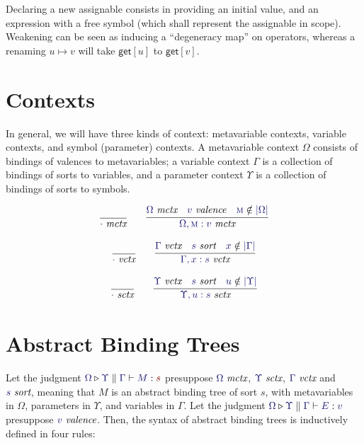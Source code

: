 \documentclass[11pt]{article}
\theoremstyle{definition}
\theoremstyle{remark}
\numberwithin{equation}{section}
\def\IModeColorName{MidnightBlue}
\def\OModeColorName{Maroon}
\newcommand\IMode[1]{{\color{\IModeColorName}{#1}}}
\newcommand\OMode[1]{{\color{\OModeColorName}{#1}}}
\newcommand\IsValence[1]{\IMode{#1}\ \textit{valence}}
\newcommand\IsSort[1]{\IMode{#1}\ \textit{sort}}
\newcommand\IsMetaCtx[1]{\IMode{#1}\ \textit{mctx}}
\newcommand\IsVarCtx[1]{\IMode{#1}\ \textit{vctx}}
\newcommand\IsSymCtx[1]{\IMode{#1}\ \textit{sctx}}
\newcommand\IsAbt[5]{%
  \IMode{#1}\triangleright%
  \IMode{#2}\parallel%
  \IMode{#3}\vdash%
  \IMode{#4}:\OMode{#5}%
}
\newcommand\IsBTm[5]{%
  \IMode{#1}\triangleright%
  \IMode{#2}\parallel%
  \IMode{#3}\vdash%
  \IMode{#4}:\IMode{#5}%
}
\newcommand\MV[1]{\textsc{#1}}
\newcommand\Dom[1]{\left\vert #1\right\vert}
\newcommand\NotIn[2]{\IMode{#1}\notin\IMode{#2}}
\begin{document}
Declaring a new assignable consists in providing an initial value, and an
expression with a free symbol (which shall represent the assignable in scope).
Weakening can be seen as inducing a ``degeneracy map'' on operators, whereas a
renaming $u\mapsto v$ will take $\mathsf{get}[u]$ to $\mathsf{get}[v]$.

\section{Contexts}

In general, we will have three kinds of context: metavariable contexts,
variable contexts, and symbol (parameter) contexts. A metavariable context
$\Omega$ consists of bindings of valences to metavariables; a variable context
$\Gamma$ is a collection of bindings of sorts to variables, and a parameter
context $\Upsilon$ is a collection of bindings of sorts to symbols.

\begin{gather*}
  \infer{
    \IsMetaCtx{\cdot}
  }{
  }\qquad
  \infer{
    \IsMetaCtx{\Omega,\MV{m}:v}
  }{
    \IsMetaCtx{\Omega} &
    \IsValence{v} &
    \NotIn{\MV{m}}{\Dom\Omega}
  }
\end{gather*}

\begin{gather*}
  \infer{
    \IsVarCtx{\cdot}
  }{
  }\qquad
  \infer{
    \IsVarCtx{\Gamma,x:s}
  }{
    \IsVarCtx{\Gamma} &
    \IsSort{s} &
    \NotIn{x}{\Dom\Gamma}
  }
\end{gather*}

\begin{gather*}
  \infer{
    \IsSymCtx{\cdot}
  }{
  }\qquad
  \infer{
    \IsSymCtx{\Upsilon,u:s}
  }{
    \IsVarCtx{\Upsilon} &
    \IsSort{s} &
    \NotIn{u}{\Dom\Upsilon}
  }
\end{gather*}

\section{Abstract Binding Trees}

Let the judgment $\IsAbt{\Omega}{\Upsilon}{\Gamma}{M}{s}$ presuppose
$\IsMetaCtx{\Omega}$, $\IsSymCtx\Upsilon$, $\IsVarCtx\Gamma$ and $\IsSort{s}$,
meaning that $M$ is an abstract binding tree of sort $s$, with metavariables in
$\Omega$, parameters in $\Upsilon$, and variables in $\Gamma$. Let the judgment
$\IsBTm{\Omega}{\Upsilon}{\Gamma}{E}{v}$ presuppose $\IsValence{v}$.  Then, the
syntax of abstract binding trees is inductively defined in four rules:
\end{document}
